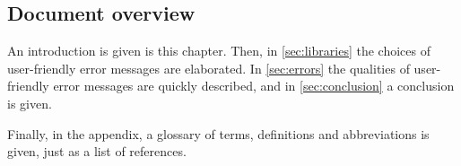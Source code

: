 \subsection{Document overview}
An introduction is given is this chapter.
Then, in \autoref{sec:libraries} the choices of user-friendly error messages are elaborated.
In \autoref{sec:errors} the qualities of user-friendly error messages are quickly described, and in \autoref{sec:conclusion} a conclusion is given.

Finally, in the appendix, a glossary of terms, definitions and abbreviations is given, just as a list of references.
